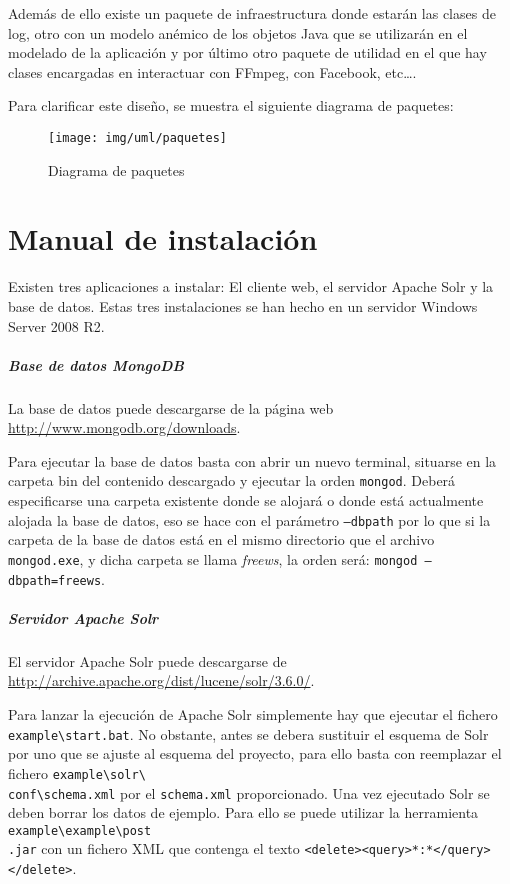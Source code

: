 \documentclass[11pt]{book}
\begin{document}
Además de ello existe un paquete de infraestructura donde estarán las clases de log, otro con un modelo anémico de los objetos Java que se utilizarán en el modelado de la aplicación y por último otro paquete de utilidad en el que hay clases encargadas en interactuar con FFmpeg, con Facebook, etc\dots.

Para clarificar este diseño, se muestra el siguiente diagrama de paquetes:

\begin{figure}[ht]
\centering
\texttt{[image: img/uml/paquetes]}
\caption{Diagrama de paquetes}
\label{uml:paquetes}
\end{figure}
\chapter{Manual de instalación}
Existen tres aplicaciones a instalar: El cliente web, el servidor Apache Solr y la base de datos. Estas tres instalaciones se han hecho en un servidor Windows Server 2008 R2.

\paragraph{Base de datos MongoDB}
La base de datos puede descargarse de la página web \url{http://www.mongodb.org/downloads}. 

Para ejecutar la base de datos basta con abrir un nuevo terminal, situarse en la carpeta bin del contenido descargado y ejecutar la orden \texttt{mongod}. Deberá especificarse una carpeta existente donde se alojará o donde está actualmente alojada la base de datos, eso se hace con el parámetro \texttt{--dbpath} por lo que si la carpeta de la base de datos está en el mismo directorio que el archivo \texttt{mongod.exe}, y dicha carpeta se llama \textit{freews}, la orden será: \texttt{mongod --dbpath=freews}.

\paragraph{Servidor Apache Solr}
El servidor Apache Solr puede descargarse de \url{http://archive.apache.org/dist/lucene/solr/3.6.0/}.

Para lanzar la ejecución de Apache Solr simplemente hay que ejecutar el fichero \texttt{example\textbackslash start.bat}. No obstante, antes se debera sustituir el esquema de Solr por uno que se ajuste al esquema del proyecto, para ello basta con reemplazar el fichero \texttt{example\textbackslash solr\textbackslash \\conf\textbackslash schema.xml} por el \texttt{schema.xml} proporcionado. Una vez ejecutado Solr se deben borrar los datos de ejemplo. Para ello se puede utilizar la herramienta \texttt{example\textbackslash example\textbackslash post\\.jar} con un fichero XML que contenga el texto \texttt{<delete><query>*:*</query></delete>}.
\end{document}
